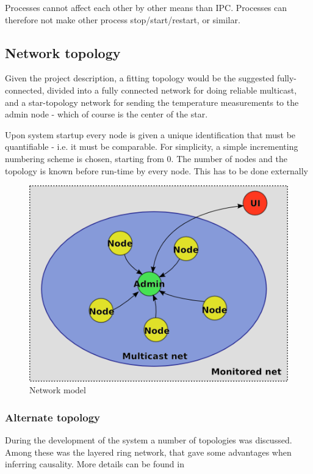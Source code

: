 \documentclass[10pt,a4paper]{article}
\begin{document}
Processes cannot affect each other by other means than IPC. Processes can therefore not make other process stop/start/restart, or similar.

\subsection{Network topology}
Given the project description, a fitting topology would be the suggested fully-connected, divided into a fully connected network for doing reliable multicast, and a star-topology network for sending the temperature measurements to the admin node - which of course is the center of the star.

Upon system startup every node is given a unique identification that must be quantifiable - i.e. it must be comparable. For simplicity, a simple incrementing numbering scheme is chosen, starting from 0. The number of nodes and the topology is known before run-time by every node. This has to be done externally

\begin{figure}[h]
\centering
\includegraphics[scale=0.65]{fig/Networkmodel.png}
 \caption{Network model}
 \label{fig:network_model}
\end{figure}

\subsubsection{Alternate topology}
During the development of the system a number of topologies was discussed. Among these was the layered ring network, that gave some advantages when inferring causality. More details can be found in 
\end{document}
